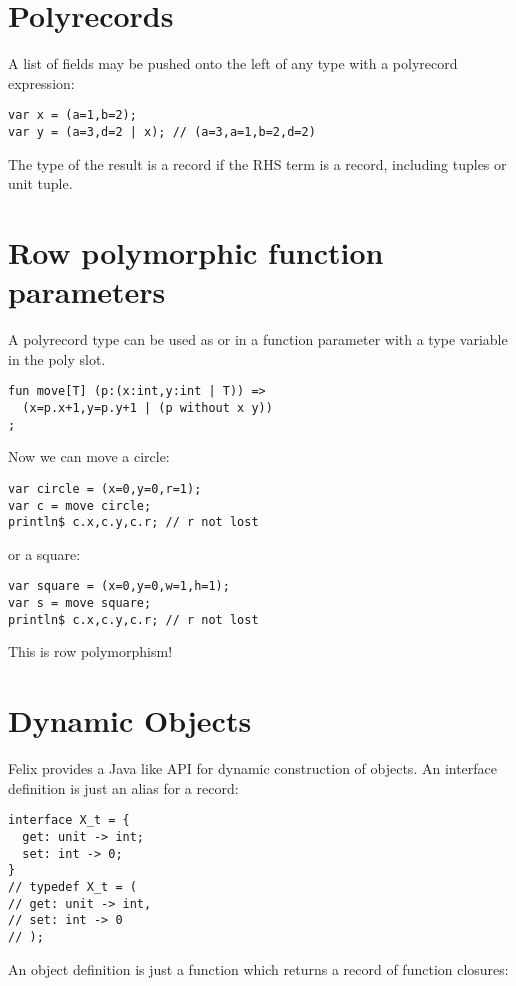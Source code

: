 \documentclass{article}
\begin{document}
\section{Polyrecords}
A list of fields may be pushed onto the left of any 
type with a polyrecord expression:

\begin{verbatim}
var x = (a=1,b=2);
var y = (a=3,d=2 | x); // (a=3,a=1,b=2,d=2)
\end{verbatim}

The type of the result is a record if the RHS term is a record, including
tuples or unit tuple. 

\section{Row polymorphic function parameters}
A polyrecord type can be used as or in a function parameter with
a type variable in the poly slot.

\begin{verbatim}
fun move[T] (p:(x:int,y:int | T)) =>
  (x=p.x+1,y=p.y+1 | (p without x y))
;
\end{verbatim}

Now we can move a circle:

\begin{verbatim}
var circle = (x=0,y=0,r=1);
var c = move circle;
println$ c.x,c.y,c.r; // r not lost
\end{verbatim}

or a square:

\begin{verbatim}
var square = (x=0,y=0,w=1,h=1);
var s = move square;
println$ c.x,c.y,c.r; // r not lost
\end{verbatim}

This is row polymorphism!

\section{Dynamic Objects}
Felix provides a Java like API for dynamic construction
of objects. An interface definition is just an alias
for a record:

\begin{verbatim}
interface X_t = { 
  get: unit -> int;
  set: int -> 0;
}
// typedef X_t = (
// get: unit -> int,
// set: int -> 0
// );
\end{verbatim}

An object definition is just a function which 
returns a record of function closures:
\end{document}
